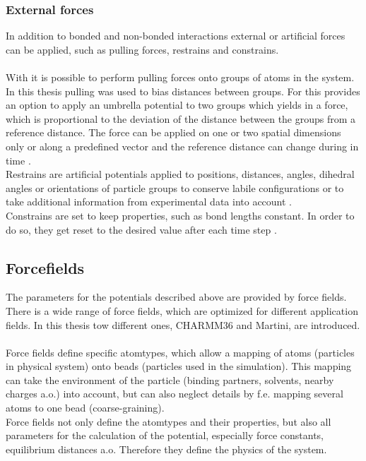 \subsubsection{External forces}
In addition to bonded and non-bonded interactions external or artificial forces can be applied, such as pulling forces, restrains and constrains.\\
\\
With \gromacs{} it is possible to perform pulling forces onto groups of atoms in the system. In this thesis pulling was used to bias distances between groups. For this \gromacs{} provides an option to apply an umbrella potential to two groups which yields in a force, which is proportional to the deviation of the distance between the groups from a reference distance. The force can be applied on one or two spatial dimensions only or along a predefined vector and the reference distance can change during in time  \autocite[p. 154-159]{gromacsManual}.\\
Restrains are artificial potentials applied to positions, distances, angles, dihedral angles or orientations of particle groups to conserve labile configurations or to take additional information from experimental data into account \autocite[p. 84f]{gromacsManual}.\\
Constrains are set to keep properties, such as bond lengths constant. In order to do so, they get reset to the desired value after each time step \autocite[p. 44f]{gromacsManual}. %
\subsection{Forcefields}
The parameters for the potentials described above are provided by force fields. There is a wide range of force fields, which are optimized for different application fields. In this thesis tow different ones, CHARMM36 and Martini, are introduced.\\
\\
Force fields define specific atomtypes, which allow a mapping of atoms (particles in physical system) onto beads (particles used in the simulation). This mapping can take the environment of the particle (binding partners, solvents, nearby charges a.o.) into account, but can also neglect details by f.e. mapping several atoms to one bead (coarse-graining).\\
Force fields not only define the atomtypes and their properties, but also all parameters for the calculation of the potential, especially force constants, equilibrium distances a.o. Therefore they define the physics of the system.
